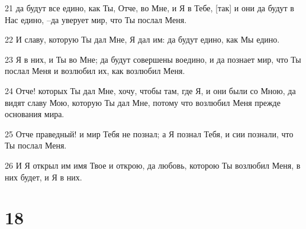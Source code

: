 \par 21 да будут все едино, как Ты, Отче, во Мне, и Я в Тебе, [так] и они да будут в Нас едино, --да уверует мир, что Ты послал Меня.
\par 22 И славу, которую Ты дал Мне, Я дал им: да будут едино, как Мы едино.
\par 23 Я в них, и Ты во Мне; да будут совершены воедино, и да познает мир, что Ты послал Меня и возлюбил их, как возлюбил Меня.
\par 24 Отче! которых Ты дал Мне, хочу, чтобы там, где Я, и они были со Мною, да видят славу Мою, которую Ты дал Мне, потому что возлюбил Меня прежде основания мира.
\par 25 Отче праведный! и мир Тебя не познал; а Я познал Тебя, и сии познали, что Ты послал Меня.
\par 26 И Я открыл им имя Твое и открою, да любовь, которою Ты возлюбил Меня, в них будет, и Я в них.

\chapter{18}

